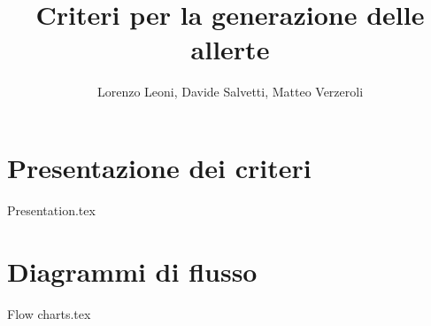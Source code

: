 \documentclass[
a4paper,
cleardoublepage=empty,
headings=twolinechapter,
numbers=autoenddot,
]{article}
\title{Criteri per la generazione delle allerte}
\author{Lorenzo Leoni, Davide Salvetti, Matteo Verzeroli}
\begin{document}
	\maketitle
	\section{Presentazione dei criteri}
	{Presentation.tex}
	\section{Diagrammi di flusso}
	{Flow charts.tex}	
\end{document}

